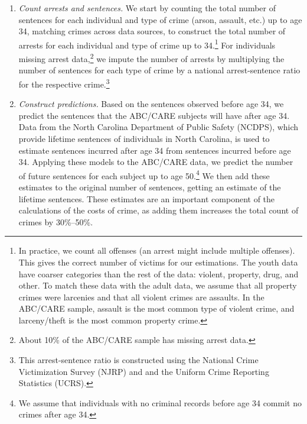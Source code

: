 \begin{enumerate}
\item \textit{Count arrests and sentences.} We start by counting the total number of sentences for each individual and type of crime (arson, assault, etc.) up to age 34, matching crimes across data sources, to construct the total number of  arrests for each individual and type of crime up to 34.\footnote{In practice, we count all offenses (an arrest might include multiple offenses). This gives the correct number of victims for our estimations. The youth data have coarser categories than the rest of the data: violent, property, drug, and other. To match these data with the adult data, we assume that all property crimes were larcenies and that all violent crimes are assaults. In the ABC/CARE sample, assault is the most common type of violent crime, and larceny/theft is the most common property crime.} For individuals missing arrest data,\footnote{About 10\% of the ABC/CARE sample has missing arrest data.} we impute the number of arrests by multiplying the number of sentences for each type of crime by a national arrest-sentence ratio for the respective crime.\footnote{This arrest-sentence ratio is constructed using the National Crime Victimization Survey (NJRP) and and the Uniform Crime Reporting Statistics (UCRS).}

\item \textit{Construct predictions.} Based on the sentences observed before age 34, we predict the sentences that the ABC/CARE subjects will have after age 34. Data from the North Carolina Department of Public Safety (NCDPS), which provide lifetime sentences of individuals in North Carolina, is used to estimate sentences incurred after age 34 from sentences incurred before age 34. Applying these models to the ABC/CARE data, we predict the number of future sentences for each subject up to age 50.\footnote{We assume that individuals with no criminal records before age 34 commit no crimes after age 34.} We then add these estimates to the original number of sentences, getting an estimate of the lifetime sentences. These estimates are an important component of the calculations of the costs of crime, as adding them increases the total count of crimes by 30\%--50\%. 


\end{enumerate}
